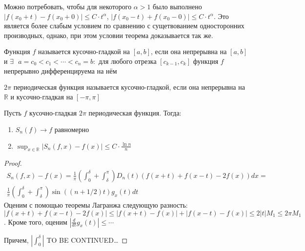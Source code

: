 \documentclass[document.tex]{subfiles}
\begin{document}
\begin{remark}
	Можно потребовать, чтобы для некоторого $\alpha > 1$ было выполнено $|f(x_0 + t) - f(x_0 + 0)| \leq C \cdot t^{\alpha}$, $|f(x_0 - t) + f(x_0 - 0)| \leq C \cdot t^{\alpha}$. Это является более слабым условием по сравнению с сущетвованием односторонних производных, однако, при этом условии теорема доказывается так же.
\end{remark}

\begin{definition}
	Функция $f$ называется кусочно-гладкой на $[a, b]$, если она непрерывна на $[a, b]$ и $\exists \text{ } a = c_0 <c_1 < \cdots < c_n = b:$ для любого отрезка $[c_{k-1}, c_k]$ функция $f$  непрерывно дифференцируема на нём
\end{definition}

\begin{definition}
	$2 \pi$ периодическая функция называется кусочно-гладкой, если она непрерывна на $\mathbb{R}$ и кусочно-гладкая на $[-\pi, \pi]$
\end{definition}

\begin{theorem}
	Пусть $f$ кусочно-гладкая $2 \pi$ периодическая функция. Тогда:
	\begin{enumerate}
		\item $S_n(f) \rightarrow f$ равномерно
		\item $\sup_{x \in \mathbb{R}} |S_n(f, x) - f(x)| \leq C \cdot \frac{\ln n}{n}$
	\end{enumerate}
\end{theorem}

\begin{proof}
	\begin{multline*}
		S_n(f, x) - f(x) = \frac{1}{\pi} \left( \int_{0}^{\delta} + \int_{\delta}^{\pi} \right) D_n(t) (f(x+t) + f(x-t) - 2f(x))dx = \\
		\frac{1}{\pi} \left( \int_{0}^{\delta} + \int_{\delta}^{\pi} \right) \sin ((n + 1/2)t) g_x(t) dt
	\end{multline*}
	Оценим с помощью теоремы Лагранжа следующую разность: $|f(x+t) + f(x-t) - 2f(x)| \leq |f(x+t) - f(x)| + |f(x - t) - f(x)| \leq 2 |t| M_1 \leq 2 \pi M_1$. Кроме того, оценим
	$|\frac{d}{dt} g_x(t)| \leq \cdots$

	Причем, $|\int_{0}^{\delta} |$
    TO BE CONTINUED\ldots
\end{proof}
\end{document}
